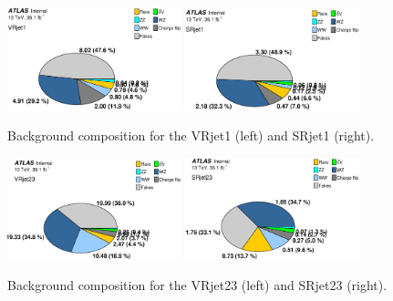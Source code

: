 \begin{figure}[htbp]
\centering
\includegraphics[width=0.45\textwidth]{data/plot/VR/BkgComposition_VRjet1.eps}
\includegraphics[width=0.45\textwidth]{data/plot/VR/BkgComposition_SRjet1.eps}
\caption{Background composition for the VRjet1 (left) and SRjet1 (right).}
\label{fig:background composition_1}
\end{figure}

\begin{figure}[htbp]
\centering
\includegraphics[width=0.45\textwidth]{data/plot/VR/BkgComposition_VRjet23.eps}
\includegraphics[width=0.45\textwidth]{data/plot/VR/BkgComposition_SRjet23.eps}
\caption{Background composition for the VRjet23 (left) and SRjet23 (right).}
\label{fig:background composition_2}
\end{figure}

